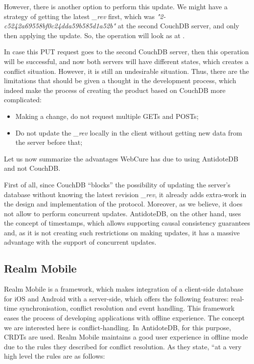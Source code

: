 However, there is another option to perform this update. We might have a strategy of getting the latest \textit{\_rev} first, which was \textit{"2-c5242a69558bf0c24dda59b585d1a52b"} at the second CouchDB server, and only then applying the update. So, the operation will look as at .

In case this PUT request goes to the second CouchDB server, then this operation will be successful, and now both servers will have different states, which creates a conflict situation. 
However, it is still an undesirable situation. Thus, there are the limitations that should be given a thought in the development process, which indeed make the process of creating the product based on CouchDB more complicated:
    \begin{itemize}
        \item {Making a change, do not request multiple GETs and POSTs;}
        \item {Do not update the \textit{\_rev} locally in the client without getting new data from the server before that;}
      \end{itemize}
      
Let us now summarize the advantages WebCure has due to using AntidoteDB and not CouchDB. 

First of all, since CouchDB ``blocks'' the possibility of updating the server's database without knowing the latest revision \textit{\_rev}, it already adds extra-work in the design and implementation of the protocol. Moreover, as we believe, it does not allow to perform concurrent updates. AntidoteDB, on the other hand, uses the concept of timestamps, which allows supporting causal consistency guarantees and, as it is not creating such restrictions on making updates, it has a massive advantage with the support of concurrent updates. 

\subsection*{Realm Mobile}

Realm Mobile is a framework, which makes integration of a client-side database for iOS and Android with a server-side, which offers the following features: real-time synchronisation, conflict resolution and event handling. This framework eases the process of developing applications with offline experience. The concept we are interested here is conflict-handling. In AntidoteDB, for this purpose, CRDTs are used. Realm Mobile maintains a good user experience in offline mode due to the rules they described for conflict resolution.
As they state, ``at a very high level the rules are as follows:

